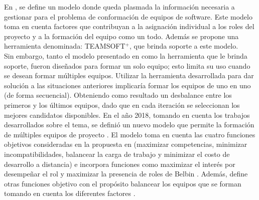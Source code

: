 En \cite{Mayi09}, se define un modelo donde queda plasmada la información necesaria a gestionar para el problema de conformación de equipos de software. Este modelo toma en cuenta factores que contribuyan a la asignación individual a los roles del proyecto y a la formación del equipo como un todo. Además se propone una herramienta denominada: TEAMSOFT$^+$, que brinda soporte a este modelo.\\

Sin embargo, tanto el modelo presentado en \cite{Mayi09} como la herramienta que le brinda soporte, fueron diseñados para formar un solo equipo; esto limita su uso cuando se desean formar múltiples equipos. Utilizar la herramienta desarrollada para dar solución a las situaciones anteriores implicaría formar los equipos de uno en uno (de forma secuencial). Obteniendo como resultado un desbalance entre los primeros y los últimos equipos, dado que en cada iteración se seleccionan los mejores candidatos disponibles. En el año 2018, tomando en cuenta los trabajos desarrollados sobre el tema, se definió un nuevo modelo que permite la formación de múltiples equipos de proyecto \cite{Duran2019}. El modelo toma en cuenta las cuatro funciones objetivos consideradas en la propuesta en \cite{Mayi09} (maximizar competencias, minimizar incompatibilidades, balancear la carga de trabajo y minimizar el costo de desarrollo a distancia) e incorpora funciones como maximizar el interés por desempeñar el rol y maximizar la presencia de roles de Belbin \cite{Mayi09}. Además, define otras funciones objetivo con el propósito balancear los equipos que se forman tomando en cuenta los diferentes factores \cite{Duran2019}.\\

